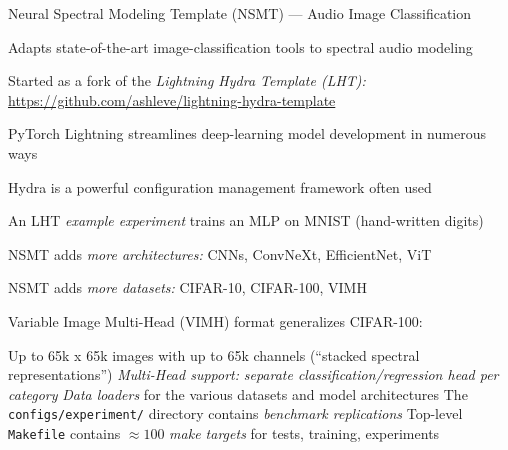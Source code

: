 



\begin{slide}[\slideopts,toc={NSMT}]{Neural Spectral Modeling Template (NSMT) --- Audio Image Classification}


  

  \begin{itemize}

    \mpitem Adapts state-of-the-art image-classification tools to spectral audio modeling

    \mpitem Started as a fork of the \emph{Lightning Hydra Template (LHT):} \url{https://github.com/ashleve/lightning-hydra-template}
    \begin{itemize}

      \mpitem PyTorch Lightning streamlines deep-learning model development in
      numerous ways

      \mpitem Hydra is a powerful configuration management framework often used

      \mpitem An LHT \emph{example experiment} trains an MLP on MNIST (hand-written digits)

    \end{itemize}

    \mpitem NSMT adds \emph{more architectures:} CNNs, ConvNeXt, EfficientNet, ViT

    \mpitem NSMT adds \emph{more datasets:} CIFAR-10, CIFAR-100, VIMH

    \mpitem Variable Image Multi-Head (VIMH) format generalizes CIFAR-100:
    \begin{itemize}
      \mpitem Up to 65k x 65k images with up to 65k channels (``stacked spectral representations'')
      \mpitem \emph{Multi-Head support:} \emph{separate classification/regression head per category}
      \mpitem \emph{Data loaders} for the various datasets and model architectures
      \mpitem The \texttt{configs/experiment/} directory contains \emph{benchmark replications} %
      \mpitem Top-level \texttt{Makefile} contains $\approx100$ \emph{make targets} for tests, training, experiments
    \end{itemize}
  \end{itemize}

\end{slide}

